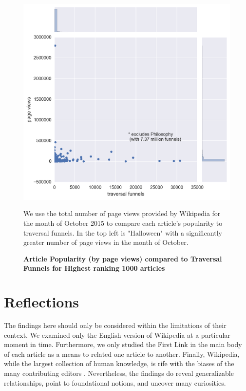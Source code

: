 \documentclass[pre,twocolumn,twoside,superscriptaddress,floatfix, aps, 10pt]{revtex4-1}
\begin{document}
\begin{figure}[tp!]
  \centering	
  \includegraphics[width=\columnwidth]{graphics/funnels_visits.png}
  \caption{
    \textbf{Article Popularity (by page views) compared to Traversal Funnels
    for Highest ranking 1000 articles}
  }
    We use the total number of page views provided by Wikipedia for the month
    of October 2015 to compare each article's popularity to traversal funnels.
    In the top left is "Halloween" with a significantly greater 
    number of page views in the month of October.
  \label{fig:Views and Funnels}
\end{figure}




\section{Reflections}

The findings here should only be considered within the limitations of their context.
We examined only the English version of Wikipedia at a particular moment in time.
Furthermore, we only studied the First Link in the main body  of each article
as a means to related one article to another. Finally, Wikipedia, while the largest 
collection of human knowledge, is rife with the biases of the many contributing editors
\cite{bias}
. Nevertheless, the findings do reveal
generalizable relationships, point to foundational notions, and uncover many curiosities.
\end{document}
